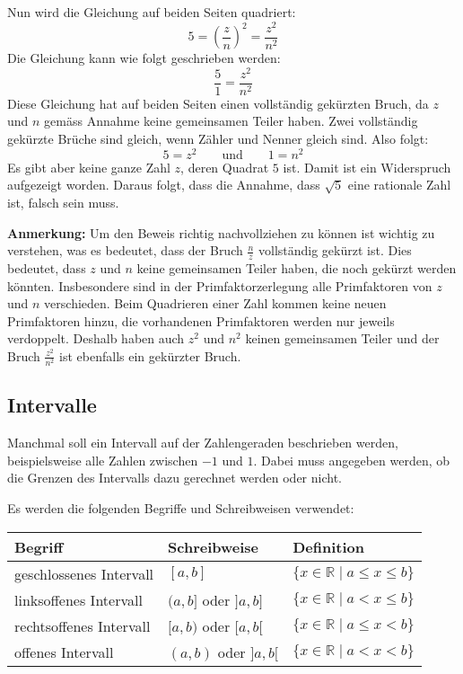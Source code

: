 Nun wird die Gleichung auf beiden Seiten quadriert:
\[
  5 = \left(\frac{z}{n}\right)^{2} = \frac{z^{2}}{n^{2}}
\]
Die Gleichung kann wie folgt geschrieben werden:
\[
  \frac{5}{1} = \frac{z^{2}}{n^{2}}
\]
Diese Gleichung hat auf beiden Seiten einen vollständig gekürzten Bruch, da $z$ und $n$ gemäss Annahme keine gemeinsamen Teiler haben. Zwei vollständig gekürzte Brüche sind gleich, wenn Zähler und Nenner gleich sind. Also folgt:
\[
  5 = z^{2} \qquad\text{und}\qquad 1 = n^{2}
\]
Es gibt aber keine ganze Zahl $z$, deren Quadrat $5$ ist. Damit ist ein Widerspruch aufgezeigt worden. Daraus folgt, dass die Annahme, dass $\sqrt{5}$ eine rationale Zahl ist, falsch sein muss.
\begin{note}
  \textbf{Anmerkung:} Um den Beweis richtig nachvollziehen zu können ist wichtig zu verstehen, was es bedeutet, dass der Bruch $\frac{n}{z}$ vollständig gekürzt ist. Dies bedeutet, dass $z$ und $n$ keine gemeinsamen Teiler haben, die noch gekürzt werden könnten. Insbesondere sind in der Primfaktorzerlegung alle Primfaktoren von $z$ und $n$ verschieden. Beim Quadrieren einer Zahl kommen keine neuen Primfaktoren hinzu, die vorhandenen Primfaktoren werden nur jeweils verdoppelt. Deshalb haben auch $z^{2}$ und $n^{2}$ keinen gemeinsamen Teiler und der Bruch $\frac{z^{2}}{n^{2}}$ ist ebenfalls ein gekürzter Bruch.
\end{note}

\subsection{Intervalle}

Manchmal soll ein Intervall auf der Zahlengeraden beschrieben werden, beispielsweise alle Zahlen zwischen $-1$ und $1$. Dabei muss angegeben werden, ob die Grenzen des Intervalls dazu gerechnet werden oder nicht.

Es werden die folgenden Begriffe und Schreibweisen verwendet:

\begin{center}
  \renewcommand{\arraystretch}{1.1}
  \begin{tabularx}{0.9\textwidth}{XXX}
    \textbf{Begriff} & \textbf{Schreibweise} & \textbf{Definition} \\
  \toprule
    geschlossenes Intervall & $[a, b]$ & $\{ x\in\mathbb{R} \;|\; a \leq x \leq b\}$ \\
  \midrule
    linksoffenes Intervall & $(a, b]$ oder $]a, b]$ & $\{ x\in\mathbb{R} \;|\; a< x \leq b\}$ \\
  \midrule
    rechtsoffenes Intervall & $[a, b)$ oder $[a, b[$ & $\{ x\in\mathbb{R} \;|\; a \leq x < b\}$ \\
  \midrule
    offenes Intervall & $(a, b)$ oder $]a, b[$ & $\{ x\in\mathbb{R} \;|\; a< x < b\}$ \\
  \bottomrule
  \end{tabularx}
\end{center}

